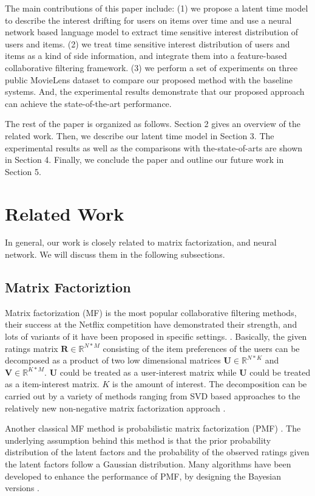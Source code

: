 \documentclass{sig-alternate-05-2015}
\begin{document}
The main contributions of this paper include:
(1) we propose a latent time model to describe the interest
drifting for users on items over time and
use a neural network based language model to extract
time sensitive interest distribution of users and items.
(2) we treat time sensitive interest distribution of users and items
as a kind of side information, and integrate them into
a feature-based collaborative filtering framework.
(3) we perform a set of experiments on three public
MovieLens dataset to compare our proposed method
with the baseline systems.
And, the experimental results demonstrate that
our proposed approach can achieve the state-of-the-art performance.

The rest of the paper is organized as follows.
Section 2 gives an overview of the related work.
Then, we describe our latent time model in Section 3.
The experimental results as well as the comparisons with
the-state-of-arts are shown in Section 4.
Finally, we conclude the paper and
outline our future work in Section 5.

\section{Related Work}
In general, our work is closely related to matrix factorization,
and neural network. We will discuss them in the following subsections.

\subsection{Matrix Factoriztion}
Matrix factorization (MF) is the most popular collaborative filtering methods,
their success at the Netflix competition have demonstrated their strength,
and lots of variants of it have been proposed in specific settings.
\cite{koren2009matrix, bennett2007netflix}.
Basically, the given ratings matrix $\mathbf{R} \in \mathbb{R}^{N*M}$
consisting of the item preferences of the users can be decomposed as
a product of two low dimensional matrices $\mathbf{U} \in \mathbb{R}^{N*K}$
and $\mathbf{V} \in \mathbb{R}^{K*M}$.
$\mathbf{U}$ could be treated as a user-interest matrix while
$\mathbf{U}$ could be treated as a item-interest matrix.
$K$ is the amount of interest.
The decomposition can be carried out by a variety of methods
ranging from SVD based approaches \cite{mazumder2010spectral}
to the relatively new non-negative
matrix factorization approach \cite{lee2001algorithms}.

Another classical MF method is probabilistic matrix factorization
(PMF) \cite{salakhutdinov2011probabilistic}.
The underlying assumption behind this method is that
the prior probability distribution of the latent factors and
the probability of the observed ratings given the latent factors
follow a Gaussian distribution.
Many algorithms have been developed to enhance the performance of PMF,
by designing the Bayesian versions \cite{salakhutdinov2008bayesian, xu2013fast, shi2013scmf}.
\end{document}
